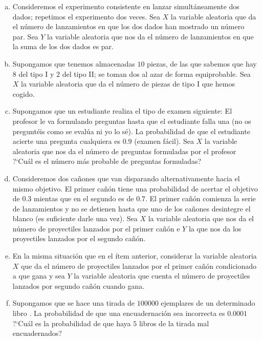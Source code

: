 \documentclass[12pt]{article}
\begin{document}
\begin{enumerate}[a)]
\item Consideremos el experimento  consistente en lanzar simultáneamente dos dados; repetimos
el ex\-pe\-ri\-mento dos veces. Sea $X$ la variable aleatoria que da  el número de
lanzamientos en que los dos dados han mostrado un número par. Sea $Y$ la variable aleatoria
que nos da el número de lanzamientos en que la suma de los dos dados es par.

\item  Supongamos que tenemos almacenadas $10$ piezas, de las que sabemos que hay $8$ del
tipo I y $2$ del tipo II; se toman dos al azar de forma equiprobable. Sea $X$ la variable
aleatoria que da el número de piezas de tipo I que hemos cogido.

\item  Supongamos  que un estudiante realiza el tipo de examen siguiente: El profesor le va
formulando preguntas hasta que el estudiante falla una (no os preguntéis como se evalúa ni
yo lo sé). La probabilidad  de que el estudiante acierte  una pregunta cualquiera es $0.9$
(examen fácil). Sea $X$ la variable aleatoria que nos da el número de preguntas formuladas
por el profesor ?`Cuál es el número más probable de preguntas formuladas?

\item   Consideremos  dos cañones que van disparando alternativamente hacia el mismo
objetivo. El primer cañón tiene una probabilidad de acertar el objetivo de $0.3$ mientas
que en el segundo es de $0.7$. El primer cañón comienza la serie de lanzamientos y no se
detienen hasta que uno de los cañones desintegre el blanco (es suficiente darle una vez).
Sea $X$ la variable aleatoria que nos da el número de proyectiles lanzados por el primer
cañón e $Y$ la que nos da los proyectiles lanzados por el segundo cañón.

\item  En la misma situación que en el ítem anterior,
considerar la variable aleatoria $X$ que da el número de proyectiles lanzados por el primer
cañón condicionado a que gana  y sea  $Y$ la variable aleatoria que cuenta el número de
proyectiles lanzados por segundo cañón cuando gana.

\item  Supongamos que se hace una tirada de $100000$ ejemplares de un determinado libro
. La probabilidad de que una encuadernación sea incorrecta es  $0.0001$ ?`Cuál es la
probabilidad de que haya $5$ libros de la tirada mal encuadernados?


\end{enumerate}
\end{document}
